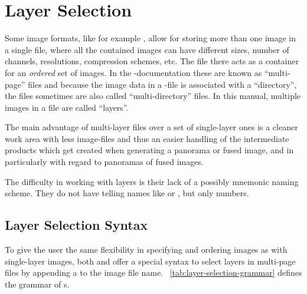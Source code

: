 

\section[Layer Selection\commonpart]{\label{sec:layer-selection}%
  Layer Selection\commonpart}

Some image formats, like for example , allow for storing more than one image in a
single file, where all the contained images can have different sizes, number of channels,
resolutions, compression schemes, etc.  The file there acts as a container for an \emph{ordered}
set of images.
%
%
%
%
In the -documentation these are known as ``multi-page'' files and because the
image data in a -file is associated with a ``directory'', the files sometimes are
also called ``multi-directory'' files.  In this manual,
multiple images in a file are called ``layers''.

The main advantage of multi-layer files over a set of single-layer ones is a cleaner work area
with less image-files and thus an easier handling of the intermediate products which get created
when generating a panorama or fused image, and in particularly with regard to panoramas of fused
images.

The difficulty in working with layers is their lack of a possibly mnemonic naming scheme.  They
do not have telling names like  or , but only
numbers.


\subsection[Layer Selection Syntax]{\label{sec:layer-selection-syntax}%
  Layer Selection Syntax}

To give the user the same flexibility in specifying and ordering images as with single-layer
images, both \App{} and \OtherApp{} offer a special syntax to select layers in multi-page files
by appending a  to the image file name.
\tableName~\ref{tab:layer-selection-grammar} defines the grammar of
\/s.

